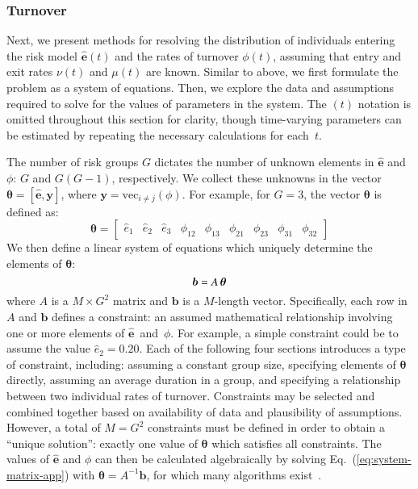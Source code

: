 \subsubsection{Turnover}
\label{aaa:params-turnover}
Next, we present methods for resolving
the distribution of individuals entering the risk model $\bm{\hat{e}}(t)$ and
the rates of turnover $\phi(t)$,
assuming that entry and exit rates $\nu(t)$ and $\mu(t)$ are known.
Similar to above, we first formulate the problem as a system of equations.
Then, we explore the data and assumptions required
to solve for the values of parameters in the system.
The $(t)$ notation is omitted throughout this section for clarity,
though time-varying parameters can be estimated by
repeating the necessary calculations for each~$t$.
\par
The number of risk groups $G$ dictates the number of
unknown elements in $\bm{\hat{e}}$ and $\phi$: $G$ and $G(G-1)$, respectively.
We collect these unknowns in the vector
$\bm{\theta} = \left[\bm{\hat{e}}, \bm{y}\right]$,
where $\bm{y} = \mathrm{vec}_{i \ne j}(\phi)$.
For example, for $G = 3$, the vector $\bm{\theta}$ is defined as:
\begin{equation}
\bm{\theta} = \left[
\begin{array}{ccccccccc}
\hat{e}_1 & \hat{e}_2 & \hat{e}_3 & \phi_{12} & \phi_{13} & \phi_{21} & \phi_{23} & \phi_{31} & \phi_{32}
\end{array}\right]
\end{equation}
We then define a linear system of equations
which uniquely determine the elements of $\bm{\theta}$:
\begin{equation}\label{eq:system-matrix-app}
\bm{b} = A \thinspace \bm{\theta}
\end{equation}
where $A$ is a $M \times G^2$ matrix
and $\bm{b}$ is a $M$-length vector.
Specifically, each row in $A$ and $\bm{b}$ defines a constraint:
an assumed mathematical relationship involving one or more elements of
$\bm{\hat{e}}$~and~$\phi$.
For example, a simple constraint could be to assume the value $\hat{e}_2 = 0.20$.
Each of the following four sections introduces a type of constraint, including:
assuming a constant group size,
specifying elements of $\bm{\theta}$ directly,
assuming an average duration in a group,
and specifying a relationship between two individual rates of turnover.
Constraints may be selected and combined together based on
availability of data and plausibility of assumptions.
However, a total of $M = G^2$ constraints must be defined
in order to obtain a ``unique solution'':
exactly one value of $\bm{\theta}$ which satisfies all constraints.
The values of $\bm{\hat{e}}$ and $\phi$
can then be calculated algebraically by solving Eq.~(\ref{eq:system-matrix-app})
with $\bm{\theta} = A^{-1}\bm{b}$,
for which many algorithms exist~\citep{LAPACK}.
